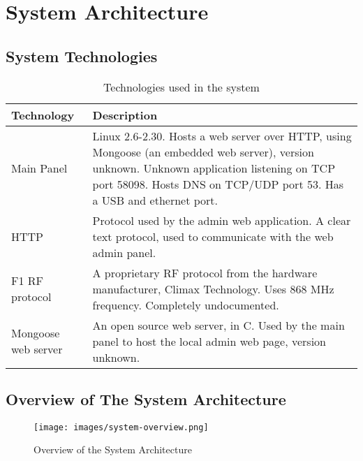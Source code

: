 \section{System Architecture}

\subsection{System Technologies}
\begin{table}[!ht]
    \centering
    \begin{tabularx}{\textwidth}{l X}
        \textbf{Technology}  & \textbf{Description} \\
        \hline
        Main Panel & Linux 2.6-2.30. Hosts a web server over HTTP, using Mongoose (an embedded web server), version unknown. Unknown application listening on TCP port 58098. Hosts DNS on TCP/UDP port 53. Has a USB and ethernet port. \\
        \hline
        HTTP  & Protocol used by the admin web application. A clear text protocol, used to communicate with the web admin panel. \\
        \hline
        F1 RF protocol  & A proprietary \gls{RF} protocol from the hardware manufacturer, Climax Technology. Uses 868 MHz frequency. Completely undocumented. \\
        \hline
        Mongoose web server  & An open source web server, in C. Used by the main panel to host the local admin web page, version unknown. \\
        \hline
    \end{tabularx}
    \caption{Technologies used in the system}
    \label{tb:system-technologies}
\end{table}

\subsection{Overview of The System Architecture}
\begin{figure}[!ht]
    \centering
    \texttt{[image: images/system-overview.png]}
    \caption{Overview of the System Architecture}
    \label{fig:system-overview}
\end{figure}
